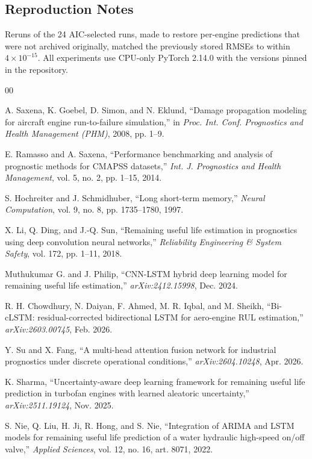 \documentclass[conference]{IEEEtran}
\begin{document}
\subsection{Reproduction Notes}
Reruns of the 24 AIC-selected runs, made to restore per-engine predictions that were not archived originally, matched the previously stored RMSEs to within $4\times10^{-15}$. All experiments use CPU-only PyTorch 2.14.0 with the versions pinned in the repository.

\small
\begin{thebibliography}{00}

 A. Saxena, K. Goebel, D. Simon, and N. Eklund, ``Damage propagation modeling for aircraft engine run-to-failure simulation,'' in \emph{Proc. Int. Conf. Prognostics and Health Management (PHM)}, 2008, pp. 1--9.

 E. Ramasso and A. Saxena, ``Performance benchmarking and analysis of prognostic methods for CMAPSS datasets,'' \emph{Int. J. Prognostics and Health Management}, vol. 5, no. 2, pp. 1--15, 2014.

 S. Hochreiter and J. Schmidhuber, ``Long short-term memory,'' \emph{Neural Computation}, vol. 9, no. 8, pp. 1735--1780, 1997.

 X. Li, Q. Ding, and J.-Q. Sun, ``Remaining useful life estimation in prognostics using deep convolution neural networks,'' \emph{Reliability Engineering \& System Safety}, vol. 172, pp. 1--11, 2018.

 Muthukumar G. and J. Philip, ``CNN-LSTM hybrid deep learning model for remaining useful life estimation,'' \emph{arXiv:2412.15998}, Dec. 2024.

 R. H. Chowdhury, N. Daiyan, F. Ahmed, M. R. Iqbal, and M. Sheikh, ``Bi-cLSTM: residual-corrected bidirectional LSTM for aero-engine RUL estimation,'' \emph{arXiv:2603.00745}, Feb. 2026.

 Y. Su and X. Fang, ``A multi-head attention fusion network for industrial prognostics under discrete operational conditions,'' \emph{arXiv:2604.10248}, Apr. 2026.

 K. Sharma, ``Uncertainty-aware deep learning framework for remaining useful life prediction in turbofan engines with learned aleatoric uncertainty,'' \emph{arXiv:2511.19124}, Nov. 2025.

 S. Nie, Q. Liu, H. Ji, R. Hong, and S. Nie, ``Integration of ARIMA and LSTM models for remaining useful life prediction of a water hydraulic high-speed on/off valve,'' \emph{Applied Sciences}, vol. 12, no. 16, art. 8071, 2022.


\end{thebibliography}
\end{document}
